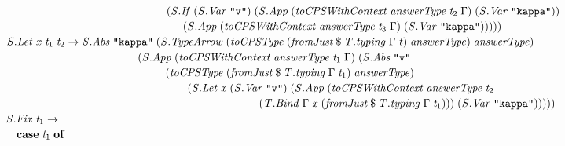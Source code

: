 \documentclass[10pt]{article}
\newcommand{\Conid}[1]{\mathit{#1}}
\newcommand{\Varid}[1]{\mathit{#1}}
\begin{document}
\begin{hscode}
${\hskip1.00em\relax\hskip1.00em\relax\phantom{\Conid{\Conid{S}.If}\;\Varid{t}_{1}\;\Varid{t}_{2}\;\Varid{t}_{3}\to \Conid{\Conid{S}.Abs}\;\mbox{}}\phantom{(\Conid{\Conid{S}.App}\;(\mbox{}}\hskip1.50em\relax(\Conid{\Conid{S}.If}\;(\Conid{\Conid{S}.Var}\;\text{\tt \char34 v\char34})\;(\Conid{\Conid{S}.App}\;(\Varid{toCPSWithContext}\;\Varid{answerType}\;\Varid{t}_{2}\;\Gamma)\;(\Conid{\Conid{S}.Var}\;\text{\tt \char34 kappa\char34}))\;}$\\
${\hskip1.00em\relax\hskip1.00em\relax\phantom{\Conid{\Conid{S}.If}\;\Varid{t}_{1}\;\Varid{t}_{2}\;\Varid{t}_{3}\to \Conid{\Conid{S}.Abs}\;\mbox{}}\phantom{(\Conid{\Conid{S}.App}\;(\mbox{}}\hskip1.50em\relax\hskip1.50em\relax(\Conid{\Conid{S}.App}\;(\Varid{toCPSWithContext}\;\Varid{answerType}\;\Varid{t}_{3}\;\Gamma)\;(\Conid{\Conid{S}.Var}\;\text{\tt \char34 kappa\char34})))))}$\\
${\hskip1.00em\relax\hskip1.00em\relax\Conid{\Conid{S}.Let}\;\Varid{x}\;\Varid{t}_{1}\;\Varid{t}_{2}\to \Conid{\Conid{S}.Abs}\;\text{\tt \char34 kappa\char34}\;(\Conid{\Conid{S}.TypeArrow}\;(\Varid{toCPSType}\;(\Varid{fromJust}\mathbin{\$}\Varid{\Conid{T}.typing}\;\Gamma\;\Varid{t})\;\Varid{answerType})\;\Varid{answerType})\;}$\\
${\hskip1.00em\relax\hskip1.00em\relax\hskip12.00em\relax(\Conid{\Conid{S}.App}\;(\Varid{toCPSWithContext}\;\Varid{answerType}\;\Varid{t}_{1}\;\Gamma)\;(\Conid{\Conid{S}.Abs}\;\text{\tt \char34 v\char34}}$\\
${\hskip1.00em\relax\hskip1.00em\relax\hskip12.00em\relax\hskip2.50em\relax(\Varid{toCPSType}\;(\Varid{fromJust}\mathbin{\$}\Varid{\Conid{T}.typing}\;\Gamma\;\Varid{t}_{1})\;\Varid{answerType})\;}$\\
${\hskip1.00em\relax\hskip1.00em\relax\hskip12.00em\relax\hskip2.50em\relax\hskip2.00em\relax(\Conid{\Conid{S}.Let}\;\Varid{x}\;(\Conid{\Conid{S}.Var}\;\text{\tt \char34 v\char34})\;(\Conid{\Conid{S}.App}\;(\Varid{toCPSWithContext}\;\Varid{answerType}\;\Varid{t}_{2}}$\\
${\hskip1.00em\relax\hskip1.00em\relax\hskip12.00em\relax\hskip2.50em\relax\hskip2.00em\relax\hskip6.50em\relax(\Conid{\Conid{T}.Bind}\;\Gamma\;\Varid{x}\;(\Varid{fromJust}\mathbin{\$}\Varid{\Conid{T}.typing}\;\Gamma\;\Varid{t}_{1})))\;(\Conid{\Conid{S}.Var}\;\text{\tt \char34 kappa\char34})))))}$\\
${\hskip1.00em\relax\hskip1.00em\relax\Conid{\Conid{S}.Fix}\;\Varid{t}_{1}\to }$\\
${\hskip1.00em\relax\hskip1.00em\relax\hskip1.00em\relax\mathbf{case}\;\Varid{t}_{1}\;\mathbf{of}}$\\

\end{hscode}
\end{document}
